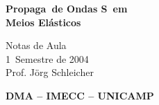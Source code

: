 \documentclass[12pt]{report}
\begin{document}
\thispagestyle{empty}

\begin{center}
\vspace*{2cm}

{\huge\bf Propaga\cao\ de Ondas S\ismicas\ em \\[0.3cm]
Meios El\'asticos}

\vfill

{\large Notas de Aula} \\[0.5cm]
{\large 1\uo\ Semestre de 2004} \\[0.5cm]
{\large Prof. J\"org Schleicher} 

\vfill

{\large\bf DMA -- IMECC -- UNICAMP}

\vspace*{1cm}

\end{center}

\newpage
\setcounter{page}{1}

\tableofcontents








%
%

\end{document}
